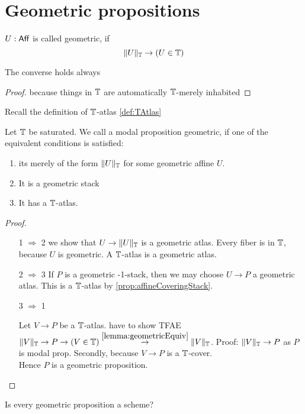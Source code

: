 
\section{Geometric propositions}
\begin{definition}
	$U : \mathsf{Aff}$ is called geometric, if 
	\[\|U\|_{\mathbb{T}} \to (U \in \mathbb{T})\]	
\end{definition}
\begin{lemma}{\label{lemma:geometricEquiv}}
	The converse holds always
\end{lemma}
\begin{proof}
	because things in $\mathbb{T}$ are automatically $\mathbb{T}$-merely inhabited
\end{proof}
Recall the definition of $\mathbb{T}$-atlas \ref{def:TAtlas}
\begin{definition}{\label{def:algprop}}
	Let $\mathbb{T}$ be saturated. We call a modal proposition geometric, if one of the equivalent conditions is satisfied:
	\begin{enumerate}
		\item  its merely of the form $\|U\|_{\mathbb{T}}$ for some geometric affine $U$.
		\item It is a geometric stack
		\item It has a $\mathbb{T}$-atlas.

	\end{enumerate}
	
\end{definition}
\begin{proof} \
	\begin{enumerate}
		\item [1 $\Rightarrow$ 2]
		we show that $U \to \|U\|_{\mathbb{T}}$ is a geometric atlas. Every fiber is in $\mathbb{T}$, because $U$ is geometric. A $\mathbb{T}$-atlas is a geometric atlas.
		\item [2 $\Rightarrow$ 3]
		If $P$ is a geometric -1-stack, then we may choose $U \to P$ a geometric atlas. This is a $\mathbb{T}$-atlas by \ref{prop:affineCoveringStack}.

		\item [3 $\Rightarrow$ 1]
		
		Let $V \to P$ be a $\mathbb{T}$-atlas.
		have to show TFAE $\|V\|_{\mathbb{T}} \to P \to (V \in \mathbb{T}) \overset{\ref{lemma:geometricEquiv}}{\to} \|V\|_{\mathbb{T}}$. 
		Proof: $\|V\|_{\mathbb{T}} \to P$ as $P$ is modal prop. Secondly, because $V \to P$ is a $\mathbb{T}$-cover. \\
		Hence $P$ is a geometric proposition.
	\end{enumerate}
	
\end{proof}
\begin{question}
Is every geometric proposition a scheme?
\end{question}

